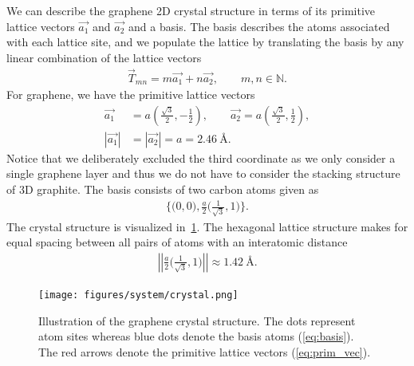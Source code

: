 \begin{multicols}{2}
We can describe the graphene 2D crystal structure in terms of its primitive lattice vectors $\vec{a_1}$ and $\vec{a_2}$ and a basis. The basis describes the atoms associated with each lattice site, and we populate the lattice by translating the basis by any linear combination of the lattice vectors 
\begin{align*}
  \vec{T}_{mn} = m\vec{a_1} + n\vec{a_2}, \qquad m,n \in \mathbb{N}.
\end{align*}
For graphene, we have the primitive lattice vectors~\cite{gray2009crystal} 
\begin{align}
  \vec{a_1} &= a \left(\frac{\sqrt{3}}{2}, -\frac{1}{2}\right), \qquad \vec{a_2} = a \left(\frac{\sqrt{3}}{2}, \frac{1}{2}\right), \label{eq:prim_vec} \\
  |\vec{a_1}| &= |\vec{a_2}| = a = 2.46 \ \text{Å}. \nonumber
\end{align}
Notice that we deliberately excluded the third coordinate as we only consider a
single graphene layer and thus we do not have to consider the stacking structure of 3D graphite. The basis consists of two carbon atoms given as 
\begin{align}
  \Big\{\Big(0,0\Big), \frac{a}{2}\Big(\frac{1}{\sqrt{3}}, 1 \Big) \Big\}.
  \label{eq:basis}
\end{align}
The crystal structure is visualized in~\cref{fig:graphene_crystal}. The hexagonal lattice structure makes for equal spacing between all pairs of atoms with an interatomic distance
\begin{align*}
  \left|\left|\frac{a}{2}\Big(\frac{1}{\sqrt{3}}, 1 \Big)\right|\right| \approx 1.42 \ \text{Å}.
\end{align*}
  
\begin{figure}[H]
  \centering
  \texttt{[image: figures/system/crystal.png]}
  \caption{Illustration of the graphene crystal structure. The dots represent atom sites whereas blue dots denote the basis atoms (\cref{eq:basis}). The red arrows denote the primitive lattice vectors (\cref{eq:prim_vec}). }
  \label{fig:graphene_crystal}
\end{figure}
  
\end{multicols}





